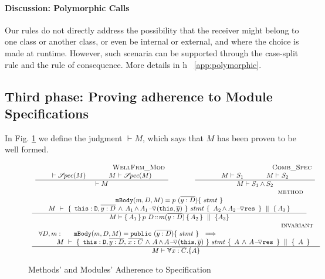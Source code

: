 \paragraph{Discussion: Polymorphic Calls} Our rules do  not directly address the possibility that the receiver might belong to one class or another class, or
even be   internal or external, and
where the choice is made at runtime. 
However, such scenaria  can be  supported through the case-split rule and the rule of consequence. 
More details in h \A\  \ref{app:polymorphic}.


\subsection{Third phase: Proving adherence to Module Specifications}
\label{sect:wf}

In Fig. \ref{f:wf} we  define the judgment $\vdash M$, which says that  
$M$ has been proven to be well formed. 
 

\begin{figure}[thb]
$
\begin{array}{l}
\begin{array}{lcl}
\inferruleSDNarrow 
{~ \strut  {\sc{WellFrm\_Mod}}}
{  \vdash \SpecOf {M}
  \hspace{1.2cm}  M \vdash \SpecOf {M}
}
{
\vdash M  
}
& \hspace{0.7cm} &
\inferruleSDNarrow 
{~ \strut   {\sc{Comb\_Spec}}}
{  
M \vdash S_1 \hspace{1.2cm}  M \vdash S_2
}
{
M \vdash S_1 \wedge S_2
}
\end{array}
\\
\inferruleSD 
{~ \strut \hspace{6.5cm} {\sc{method}}}
{  
 \prg{mBody}(m,D,M)=p \ (\overline{y:D})\{\  stmt \ \}       
    \\
  {\hprovesN{M} { \ \prg{this}:\prg{D}, \overline{y:D}\, \wedge\, A_1\, \sdN{\wedge\, \PushASLong {(\prg{this},\overline y)}  {A_1}}\, } {\ stmt\ } {\ A_2\, \sdN{\wedge\, \PushASLong {\prg{res}} {A_2}} \ }   {A_3} } 
}
{
M \vdash {\mprepostN {A_1}{p\ D}{m}{y}{D}{A_2} {A_3} }
}
\\
\inferruleSD 
{~ \strut \hspace{6.5cm} {\sc{invariant}}}
{
\begin{array}{l}
\forall  D,  m:\ \ \  \ \  \prg{mBody}(m,D,M)=\prg{public} \ (\overline{y:D})\{\  stmt \ \}      \ \ \Longrightarrow  
  \\
   ~ \strut \hspace{0.3cm}  \ \ \ 
 \begin{array}{l}
   \hprovesN {M}  
{ \ \prg{this}:\prg{D}, \overline{y:D},\,   \overline{x:C} \, \wedge\,  A \, \sdN{\wedge\, \PushASLong {(\prg{this},\overline y)} {A}}\, }  
  	{\ stmt\ }   
	 {\  A\, \wedge\, \PushASLong {\prg{res}} {A} \ }  
{\ A \ }
 \end{array}
 \end{array}
}
{
M \vdash \TwoStatesN{ \overline{x:C}} {A}
}
\end{array}
$
\caption{Methods' and Modules' Adherence to Specification}
\label{f:wf}
\end{figure}

